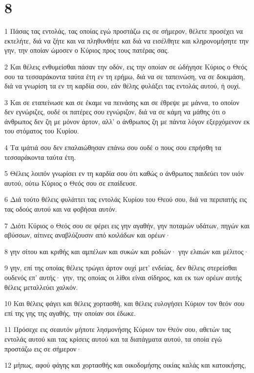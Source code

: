 \chapter{8}

\par 1 Πάσας τας εντολάς, τας οποίας εγώ προστάζω εις σε σήμερον, θέλετε προσέχει να εκτελήτε, διά να ζήτε και να πληθυνθήτε και διά να εισέλθητε και κληρονομήσητε την γην, την οποίαν ώμοσεν ο Κύριος προς τους πατέρας σας.
\par 2 Και θέλεις ενθυμείσθαι πάσαν την οδόν, εις την οποίαν σε ώδήγησε Κύριος ο Θεός σου τα τεσσαράκοντα ταύτα έτη εν τη ερήμω, διά να σε ταπεινώση, να σε δοκιμάση, διά να γνωρίση τα εν τη καρδία σου, εάν θέλης φυλάξει τας εντολάς αυτού, ή ουχί.
\par 3 Και σε εταπείνωσε και σε έκαμε να πεινάσης και σε έθρεψε με μάννα, το οποίον δεν εγνώριζες, ουδέ οι πατέρες σου εγνώριζον, διά να σε κάμη να μάθης ότι ο άνθρωπος δεν ζη με μόνον άρτον, αλλ' ο άνθρωπος ζη με πάντα λόγον εξερχόμενον εκ του στόματος του Κυρίου.
\par 4 Τα ιμάτιά σου δεν επαλαιώθησαν επάνω σου ουδέ ο πους σου επρήσθη τα τεσσαράκοντα ταύτα έτη.
\par 5 Θέλεις λοιπόν γνωρίσει εν τη καρδία σου ότι καθώς ο άνθρωπος παιδεύει τον υιόν αυτού, ούτω Κύριος ο Θεός σου σε επαίδευσε.
\par 6 Διά τούτο θέλεις φυλάττει τας εντολάς Κυρίου του Θεού σου, διά να περιπατής εις τας οδούς αυτού και να φοβήσαι αυτόν.
\par 7 Διότι Κύριος ο Θεός σου σε φέρει εις γην αγαθήν, γην ποταμών υδάτων, πηγών και αβύσσων, αίτινες αναβλύζουσιν από κοιλάδων και ορέων·
\par 8 γην σίτου και κριθής και αμπέλων και συκών και ροδιών· γην ελαιών και μέλιτος·
\par 9 γην, επί της οποίας θέλεις τρώγει άρτον ουχί μετ' ενδείας, δεν θέλεις στερείσθαι ουδενός επ' αυτής· γην, της οποίας οι λίθοι είναι σίδηρος, και εκ των ορέων αυτής θέλεις μεταλλεύει χαλκόν.
\par 10 Και θέλεις φάγει και θέλεις χορτασθή, και θέλεις ευλογήσει Κύριον τον θεόν σου επί της γης της αγαθής, την οποίαν σοι έδωκε.
\par 11 Πρόσεχε εις σεαυτόν μήποτε λησμονήσης Κύριον τον Θεόν σου, αθετών τας εντολάς αυτού και τας κρίσεις αυτού και τα διατάγματα αυτού, τα οποία εγώ προστάζω εις σε σήμερον·
\par 12 μήπως, αφού φάγης και χορτασθής και οικοδομήσης οικίας καλάς και κατοικήσης,
